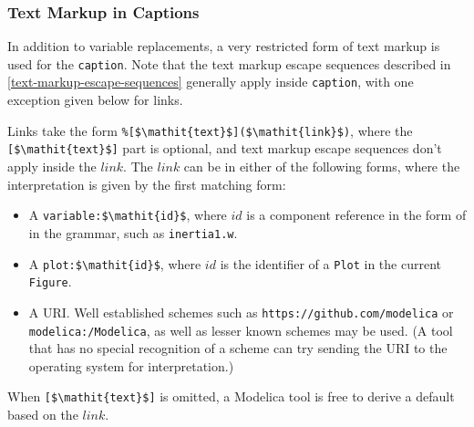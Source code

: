 \subsubsection{Text Markup in Captions}\label{text-markup-in-captions}

In addition to variable replacements, a very restricted form of text markup is used for the \lstinline!caption!.
Note that the text markup escape sequences described in \cref{text-markup-escape-sequences} generally apply inside \lstinline!caption!, with one exception given below for links.

Links take the form \lstinline!%[$\mathit{text}$]($\mathit{link}$)!, where the \lstinline![$\mathit{text}$]! part is optional, and text markup escape sequences don't apply inside the $\mathit{link}$.
The $\mathit{link}$ can be in either of the following forms, where the interpretation is given by the first matching form:
\begin{itemize}
\item
A \lstinline!variable:$\mathit{id}$!, where $\mathit{id}$ is a component reference in the form of  in the grammar, such as \lstinline!inertia1.w!.
\item
A \lstinline!plot:$\mathit{id}$!, where $\mathit{id}$ is the identifier of a \lstinline!Plot! in the current \lstinline!Figure!.
\item
A URI.
Well established schemes such as \lstinline[language={[nocomment]modelica}]!https://github.com/modelica! or \lstinline[language={[nocomment]modelica}]!modelica:/Modelica!, as well as lesser known schemes may be used.
(A tool that has no special recognition of a scheme can try sending the URI to the operating system for interpretation.)
\end{itemize}

When \lstinline![$\mathit{text}$]! is omitted, a Modelica tool is free to derive a default based on the $\mathit{link}$.

